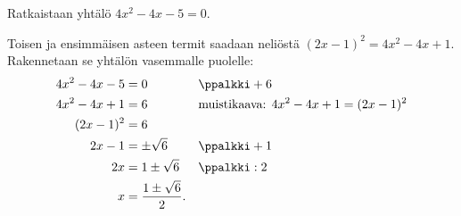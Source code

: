 \begin{esimerkki}
Ratkaistaan yhtälö $4x^2-4x-5=0$.

Toisen ja ensimmäisen asteen termit saadaan neliöstä
$(2x-1)^2=4x^2-4x+1$. Rakennetaan se yhtälön vasemmalle puolelle:
\begin{align*}
4x^2-4x-5 &= 0 && \ppalkki +6 \\
4x^2-4x+1 &= 6 &&\text{muistikaava: $  4x^2-4x+1 = (2x-1)^2$} \\
(2x-1)^2 &= 6 \\
2x-1 &= \pm \sqrt{6} && \ppalkki +1\\
2x &= 1 \pm \sqrt{6} && \ppalkki : 2\\
x &= \frac{1 \pm \sqrt{6}}{2}.
\end{align*}
\end{esimerkki}

%
%
%

